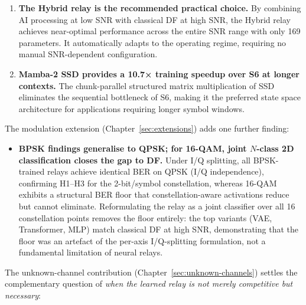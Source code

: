 \begin{enumerate}
\item
  \textbf{The Hybrid relay is the recommended practical choice.} By combining AI processing at low SNR with classical DF at high SNR, the Hybrid relay achieves near-optimal performance across the entire SNR range with only 169 parameters. It automatically adapts to the operating regime, requiring no manual SNR-dependent configuration.
\item
  \textbf{Mamba-2 SSD provides a 10.7× training speedup over S6 at longer contexts.} The chunk-parallel structured matrix multiplication of SSD eliminates the sequential bottleneck of S6, making it the preferred state space architecture for applications requiring longer symbol windows.
\end{enumerate}


The modulation extension (Chapter~\ref{sec:extensions}) adds one further finding:

\begin{itemize}
\tightlist
\item
  \textbf{BPSK findings generalise to QPSK; for 16-QAM, joint $N$-class 2D classification closes the gap to DF.} Under I/Q splitting, all BPSK-trained relays achieve identical BER on QPSK (I/Q independence), confirming H1--H3 for the 2-bit/symbol constellation, whereas 16-QAM exhibits a structural BER floor that constellation-aware activations reduce but cannot eliminate. Reformulating the relay as a joint classifier over all 16 constellation points removes the floor entirely: the top variants (VAE, Transformer, MLP) match classical DF at high SNR, demonstrating that the floor was an artefact of the per-axis I/Q-splitting formulation, not a fundamental limitation of neural relays.
\end{itemize}

The unknown-channel contribution (Chapter~\ref{sec:unknown-channels}) settles the complementary question of \emph{when the learned relay is not merely competitive but necessary}:

